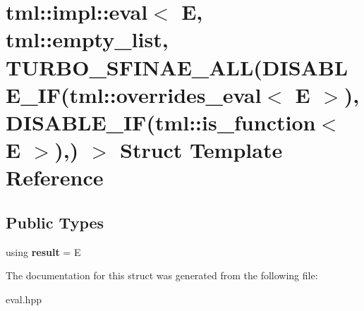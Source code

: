 \hypertarget{structtml_1_1impl_1_1eval_3_01E_00_01tml_1_1empty__list_00_01TURBO__SFINAE__ALL_07DISABLE__IF_07df7274f67ed8c5304f34d04565ad95a3}{\section{tml\+:\+:impl\+:\+:eval$<$ E, tml\+:\+:empty\+\_\+list, T\+U\+R\+B\+O\+\_\+\+S\+F\+I\+N\+A\+E\+\_\+\+A\+L\+L(D\+I\+S\+A\+B\+L\+E\+\_\+\+I\+F(tml\+:\+:overrides\+\_\+eval$<$ E $>$), D\+I\+S\+A\+B\+L\+E\+\_\+\+I\+F(tml\+:\+:is\+\_\+function$<$ E $>$),) $>$ Struct Template Reference}
\label{structtml_1_1impl_1_1eval_3_01E_00_01tml_1_1empty__list_00_01TURBO__SFINAE__ALL_07DISABLE__IF_07df7274f67ed8c5304f34d04565ad95a3}
}
\subsection*{Public Types}
\begin{DoxyCompactItemize}
\item 
\hypertarget{structtml_1_1impl_1_1eval_3_01E_00_01tml_1_1empty__list_00_01TURBO__SFINAE__ALL_07DISABLE__IF_07df7274f67ed8c5304f34d04565ad95a3_a5bfcca838a7a9837d134363c05689392}{using {\bfseries result} = E}\label{structtml_1_1impl_1_1eval_3_01E_00_01tml_1_1empty__list_00_01TURBO__SFINAE__ALL_07DISABLE__IF_07df7274f67ed8c5304f34d04565ad95a3_a5bfcca838a7a9837d134363c05689392}

\end{DoxyCompactItemize}


The documentation for this struct was generated from the following file\+:\begin{DoxyCompactItemize}
\item 
eval.\+hpp\end{DoxyCompactItemize}
